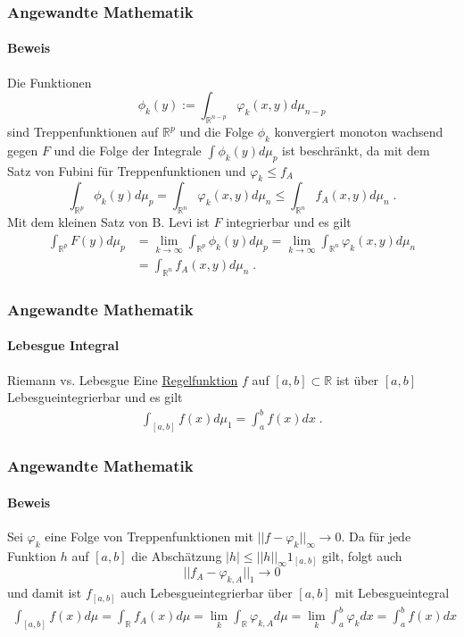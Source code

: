 \documentclass{beamer}
\begin{document}
\begin{frame}
    \frametitle{Angewandte Mathematik}
\framesubtitle{Beweis}
Die Funktionen 
$$\phi_k (y) := \int_{\mathbb{R}^{n-p}} \varphi_k (x,y) d \mu_{n-p}$$
sind Treppenfunktionen auf $\mathbb{R}^{p}$ und die Folge $\phi_k$ konvergiert monoton wachsend gegen $F$ und die Folge der Integrale 
$\int \phi_k(y) d \mu_{p}$ ist beschränkt, da  mit dem Satz von Fubini für Treppenfunktionen und $\varphi_k \leq f_A$  
$$ \int_{\mathbb{R}^{p}} \phi_k(y) d \mu_{p} = \int_{\mathbb{R}^n} \varphi_k(x,y) d\mu_{n} \leq \int_{\mathbb{R}^n} f_A(x,y) d \mu_{n} \; .$$
Mit dem kleinen Satz von B. Levi ist $F$ integrierbar und es gilt
\begin{align*}
 \int_{\mathbb{R}^{p}}   F(y) d \mu_{p} & = \lim_{k \to \infty}  \int_{\mathbb{R}^{p}}  \phi_k (y) d \mu_{p} =  \lim_{k \to \infty}  \int_{\mathbb{R}^{n}}  \varphi_k(x,y) d \mu_{n} \\
& =   \int_{\mathbb{R}^{n}}  f_A (x,y) d \mu_{n}  \; .
\end{align*} 

 \end{frame}




\begin{frame}
    \frametitle{Angewandte Mathematik}
\framesubtitle{Lebesgue Integral}
\begin{block}{Riemann vs. Lebesgue}
Eine \href{https://de.wikipedia.org/wiki/Regelfunktion}{Regelfunktion} $f$ auf $[a,b] \subset \mathbb{R}$ ist über $[a,b] $ Lebesgueintegrierbar und es gilt 
\begin{align*}
\int_{[a,b]} f(x) d \mu_1 = \int_a^b f(x) dx \; .
\end{align*}
\end{block}
 \end{frame}






\begin{frame}
    \frametitle{Angewandte Mathematik}
\framesubtitle{Beweis}
Sei $\varphi_k$ eine Folge von Treppenfunktionen mit $|| f -\varphi_k ||_{\infty} \to 0$. Da für jede Funktion $h$ auf $[a,b]$ die Abschätzung
$|h| \leq || h ||_{\infty} 1_{[a,b]}$ gilt, folgt auch $$|| f_A -\varphi_{k,A} ||_{1} \to 0$$ und damit ist $f_{[a,b]}$ auch Lebesgueintegrierbar über $[a,b]$ mit Lebesgueintegral
\begin{align*}
\int_{[a,b]} f(x) d \mu= \int_{\mathbb{R}} f_A(x) d\mu = \lim_k \int_{\mathbb{R}} \varphi_{k,A} d \mu = \lim_k \int_a^b \varphi_k dx = \int_a^b f (x) dx
\end{align*}
 

 \end{frame}
\end{document}

